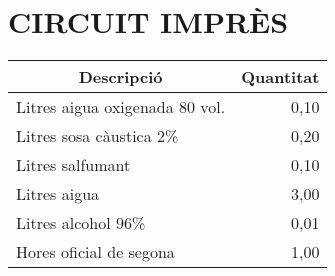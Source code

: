 \chapter{\uppercase{Circuit imprès}}

\begin{table}[H]
  \begin{center}
    \begin{tabularx} {\textwidth} {|X|r|} \hline
  \multicolumn{1}{|c|}{Descripció} &  \multicolumn{1}{c|}{Quantitat}\\ \hline \hline
    Litres aigua oxigenada 80 vol. & 0,10 \\ \hline
    Litres sosa càustica 2\% & 0,20 \\ \hline
    Litres salfumant & 0,10 \\ \hline
    Litres aigua & 3,00 \\ \hline
    Litres alcohol 96\% & 0,01 \\ \hline
    Hores oficial de segona & 1,00 \\ \hline
    \end{tabularx}%
  \end{center}

  \label{tab:addlabel}%
\end{table}%